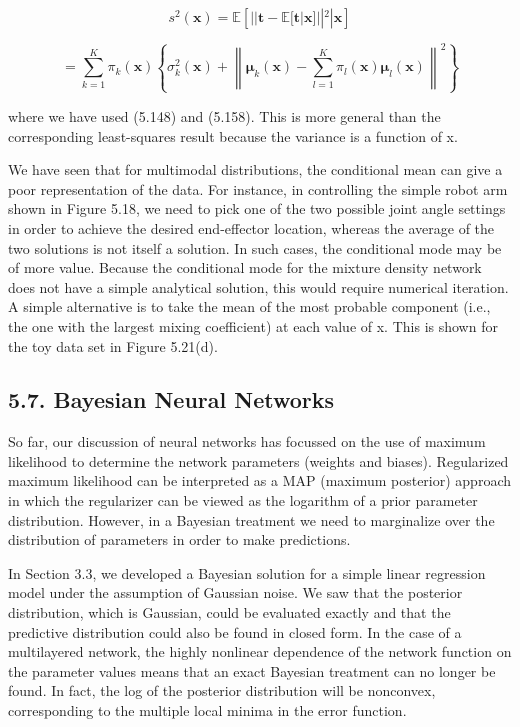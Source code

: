 \documentclass[
  10
]{article}
\begin{document}
\[
{s ^ {2} (\mathbf {x})} = {\mathbb {E} \left[ | | \mathbf {t} - \mathbb {E} [ \mathbf {t} | \mathbf {x} ] | | ^ {2} | \mathbf {x} \right]}\tag{5.159}
\]

\[
= \sum_ {k = 1} ^ {K} \pi_ {k} (\mathbf {x}) \left\{\sigma_ {k} ^ {2} (\mathbf {x}) + \left\| \boldsymbol {\mu} _ {k} (\mathbf {x}) - \sum_ {l = 1} ^ {K} \pi_ {l} (\mathbf {x}) \boldsymbol {\mu} _ {l} (\mathbf {x}) \right\| ^ {2} \right\}\tag{5.160}
\]

where we have used (5.148) and (5.158). This is more general than the
corresponding least-squares result because the variance is a function of
x.

We have seen that for multimodal distributions, the conditional mean can
give a poor representation of the data. For instance, in controlling the
simple robot arm shown in Figure 5.18, we need to pick one of the two
possible joint angle settings in order to achieve the desired
end-effector location, whereas the average of the two solutions is not
itself a solution. In such cases, the conditional mode may be of more
value. Because the conditional mode for the mixture density network does
not have a simple analytical solution, this would require numerical
iteration. A simple alternative is to take the mean of the most probable
component (i.e., the one with the largest mixing coefficient) at each
value of x. This is shown for the toy data set in Figure 5.21(d).

\subsection{5.7. Bayesian Neural
Networks}\label{bayesian-neural-networks}

So far, our discussion of neural networks has focussed on the use of
maximum likelihood to determine the network parameters (weights and
biases). Regularized maximum likelihood can be interpreted as a MAP
(maximum posterior) approach in which the regularizer can be viewed as
the logarithm of a prior parameter distribution. However, in a Bayesian
treatment we need to marginalize over the distribution of parameters in
order to make predictions.

In Section 3.3, we developed a Bayesian solution for a simple linear
regression model under the assumption of Gaussian noise. We saw that the
posterior distribution, which is Gaussian, could be evaluated exactly
and that the predictive distribution could also be found in closed form.
In the case of a multilayered network, the highly nonlinear dependence
of the network function on the parameter values means that an exact
Bayesian treatment can no longer be found. In fact, the log of the
posterior distribution will be nonconvex, corresponding to the multiple
local minima in the error function.
\end{document}
